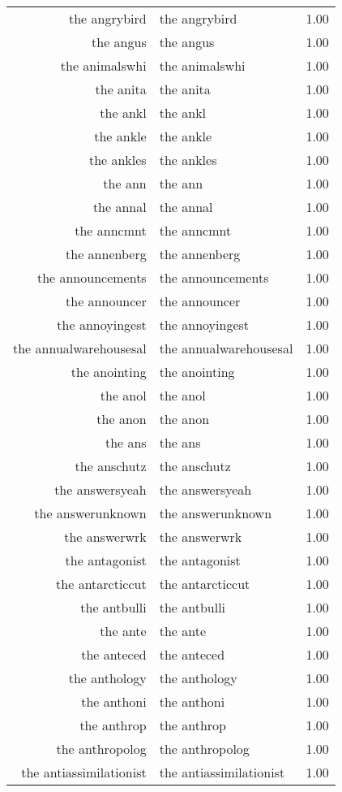 \begin{table}[ht]
\begin{tabular}{rlr}
  the angrybird & the angrybird & 1.00 \\ 
  the angus & the angus & 1.00 \\ 
  the animalswhi & the animalswhi & 1.00 \\ 
  the anita & the anita & 1.00 \\ 
  the ankl & the ankl & 1.00 \\ 
  the ankle & the ankle & 1.00 \\ 
  the ankles & the ankles & 1.00 \\ 
  the ann & the ann & 1.00 \\ 
  the annal & the annal & 1.00 \\ 
  the anncmnt & the anncmnt & 1.00 \\ 
  the annenberg & the annenberg & 1.00 \\ 
  the announcements & the announcements & 1.00 \\ 
  the announcer & the announcer & 1.00 \\ 
  the annoyingest & the annoyingest & 1.00 \\ 
  the annualwarehousesal & the annualwarehousesal & 1.00 \\ 
  the anointing & the anointing & 1.00 \\ 
  the anol & the anol & 1.00 \\ 
  the anon & the anon & 1.00 \\ 
  the ans & the ans & 1.00 \\ 
  the anschutz & the anschutz & 1.00 \\ 
  the answersyeah & the answersyeah & 1.00 \\ 
  the answerunknown & the answerunknown & 1.00 \\ 
  the answerwrk & the answerwrk & 1.00 \\ 
  the antagonist & the antagonist & 1.00 \\ 
  the antarcticcut & the antarcticcut & 1.00 \\ 
  the antbulli & the antbulli & 1.00 \\ 
  the ante & the ante & 1.00 \\ 
  the anteced & the anteced & 1.00 \\ 
  the anthology & the anthology & 1.00 \\ 
  the anthoni & the anthoni & 1.00 \\ 
  the anthrop & the anthrop & 1.00 \\ 
  the anthropolog & the anthropolog & 1.00 \\ 
  the antiassimilationist & the antiassimilationist & 1.00 \\ 

\end{tabular}
\end{table}
